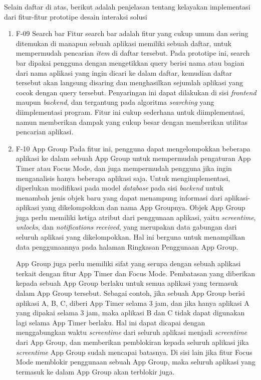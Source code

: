 Selain daftar di atas, berikut adalah penjelasan tentang kelayakan implementasi dari fitur-fitur prototipe desain interaksi solusi

\begin{enumerate}
  \item F-09 Search bar
  \subitem Fitur search bar adalah fitur yang cukup umum dan sering ditemukan di manapun sebuah aplikasi memiliki sebuah daftar, untuk mempermudah pencarian \textit{item} di daftar tersebut. Pada prototipe ini, search bar dipakai pengguna dengan mengetikkan query berisi nama atau bagian dari nama aplikasi yang ingin dicari ke dalam daftar, kemudian daftar tersebut akan langsung disaring dan menghasilkan sejumlah aplikasi yang cocok dengan query tersebut. Penyaringan ini dapat dilakukan di sisi \textit{frontend} maupun \textit{backend}, dan tergantung pada algoritma \textit{searching} yang diimplementasi program. Fitur ini cukup sederhana untuk diimplementasi, namun memberikan dampak yang cukup besar dengan memberikan utilitas pencarian aplikasi. 
    
  \item F-10 App Group
  \subitem Pada fitur ini, pengguna dapat mengelompokkan beberapa aplikasi ke dalam sebuah App Group untuk mempermudah pengaturan App Timer atau Focus Mode, dan juga mempermudah pengguna jika ingin menganalisis hanya beberapa aplikasi saja. Untuk mengimplementasi, diperlukan modifikasi pada model \textit{database} pada sisi \textit{backend} untuk menambah jenis objek baru yang dapat menampung informasi dari aplikasi-aplikasi yang dikelompokkan dan nama App Groupnya. Objek App Group juga perlu memiliki ketiga atribut dari penggunaan aplikasi, yaitu \textit{screentime}, \textit{unlocks}, dan \textit{notifications received}, yang merupakan data gabungan dari seluruh aplikasi yang dikelompokkan. Hal ini berguna untuk menampilkan data penggunaannya pada halaman Ringkasan Penggunaan App Group.

  App Group juga perlu memiliki sifat yang serupa dengan sebuah aplikasi terkait dengan fitur App Timer dan Focus Mode. Pembatasan yang diberikan kepada sebuah App Group berlaku untuk semua aplikasi yang termasuk dalam App Group tersebut. Sebagai contoh, jika sebuah App Group berisi aplikasi A, B, C, diberi App Timer selama 3 jam, dan jika hanya aplikasi A yang dipakai selama 3 jam, maka aplikasi B dan C tidak dapat digunakan lagi selama App Timer berlaku. Hal ini dapat dicapai dengan menggabungkan waktu \textit{screentime} dari seluruh aplikasi menjadi \textit{screentime} dari App Group, dan memberikan pemblokiran kepada seluruh aplikasi jika \textit{screentime} App Group sudah mencapai batasnya. Di sisi lain jika fitur Focus Mode memblokir penggunaan sebuah App Group, maka seluruh aplikasi yang termasuk ke dalam App Group akan terblokir juga.   
    

\end{enumerate}
